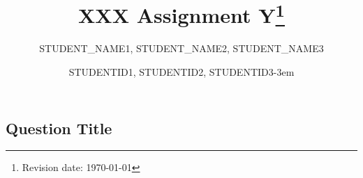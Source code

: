 \documentclass{exam}
\title{\vspace{-3em}XXX Assignment Y\footnote{Revision date: \today}}
\author{STUDENT_NAME1, STUDENT_NAME2, STUDENT_NAME3\vspace{-2em}}
\date{STUDENTID1, STUDENTID2, STUDENTID3{-3em}}
\begin{document}
\maketitle
\renewcommand{\arraystretch}{0.6}
\begin{spacing}{2}
    \subsection{Question Title}

\end{spacing}
\end{document}
